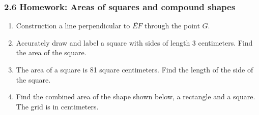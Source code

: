 \documentclass[12pt, twoside]{article}
\begin{document}
\subsubsection*{2.6 Homework: Areas of squares and compound shapes}
  \vspace{0.25cm}
  \begin{enumerate}


    \item Construction a line perpendicular to $\overleftrightarrow{EF}$ through the point $G$. \vspace{5cm}
      \begin{center}
      \end{center} \vspace{4cm}

      \item Accurately draw and label a square with sides of length 3 centimeters. Find the area of the square. \vspace{6cm}
      
      \item The area of a square is 81 square centimeters. Find the length of the side of the square.

    \newpage

    \item Find the combined area of the shape shown below, a rectangle and a square. The grid is in centimeters.
    \begin{flushleft}
    \end{flushleft} \vspace{1cm} 


\end{enumerate}
\end{document}
